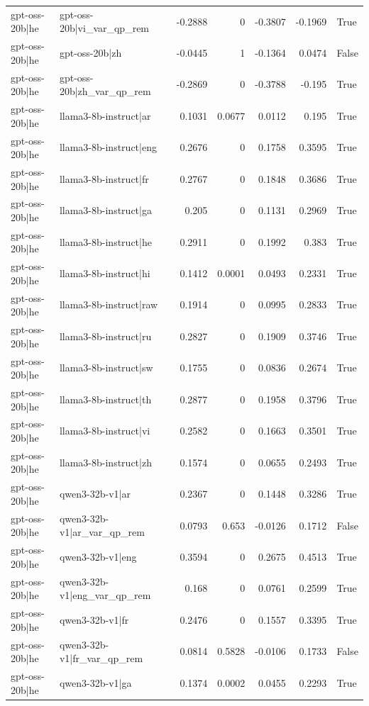 \begin{table}
\begin{tabular}{l l r r r r l}
gpt-oss-20b|he & gpt-oss-20b|vi_var_qp_rem & -0.2888 & 0 & -0.3807 & -0.1969 & True \\
gpt-oss-20b|he & gpt-oss-20b|zh & -0.0445 & 1 & -0.1364 & 0.0474 & False \\
gpt-oss-20b|he & gpt-oss-20b|zh_var_qp_rem & -0.2869 & 0 & -0.3788 & -0.195 & True \\
gpt-oss-20b|he & llama3-8b-instruct|ar & 0.1031 & 0.0677 & 0.0112 & 0.195 & True \\
gpt-oss-20b|he & llama3-8b-instruct|eng & 0.2676 & 0 & 0.1758 & 0.3595 & True \\
gpt-oss-20b|he & llama3-8b-instruct|fr & 0.2767 & 0 & 0.1848 & 0.3686 & True \\
gpt-oss-20b|he & llama3-8b-instruct|ga & 0.205 & 0 & 0.1131 & 0.2969 & True \\
gpt-oss-20b|he & llama3-8b-instruct|he & 0.2911 & 0 & 0.1992 & 0.383 & True \\
gpt-oss-20b|he & llama3-8b-instruct|hi & 0.1412 & 0.0001 & 0.0493 & 0.2331 & True \\
gpt-oss-20b|he & llama3-8b-instruct|raw & 0.1914 & 0 & 0.0995 & 0.2833 & True \\
gpt-oss-20b|he & llama3-8b-instruct|ru & 0.2827 & 0 & 0.1909 & 0.3746 & True \\
gpt-oss-20b|he & llama3-8b-instruct|sw & 0.1755 & 0 & 0.0836 & 0.2674 & True \\
gpt-oss-20b|he & llama3-8b-instruct|th & 0.2877 & 0 & 0.1958 & 0.3796 & True \\
gpt-oss-20b|he & llama3-8b-instruct|vi & 0.2582 & 0 & 0.1663 & 0.3501 & True \\
gpt-oss-20b|he & llama3-8b-instruct|zh & 0.1574 & 0 & 0.0655 & 0.2493 & True \\
gpt-oss-20b|he & qwen3-32b-v1|ar & 0.2367 & 0 & 0.1448 & 0.3286 & True \\
gpt-oss-20b|he & qwen3-32b-v1|ar_var_qp_rem & 0.0793 & 0.653 & -0.0126 & 0.1712 & False \\
gpt-oss-20b|he & qwen3-32b-v1|eng & 0.3594 & 0 & 0.2675 & 0.4513 & True \\
gpt-oss-20b|he & qwen3-32b-v1|eng_var_qp_rem & 0.168 & 0 & 0.0761 & 0.2599 & True \\
gpt-oss-20b|he & qwen3-32b-v1|fr & 0.2476 & 0 & 0.1557 & 0.3395 & True \\
gpt-oss-20b|he & qwen3-32b-v1|fr_var_qp_rem & 0.0814 & 0.5828 & -0.0106 & 0.1733 & False \\
gpt-oss-20b|he & qwen3-32b-v1|ga & 0.1374 & 0.0002 & 0.0455 & 0.2293 & True \\

\end{tabular}
\end{table}
